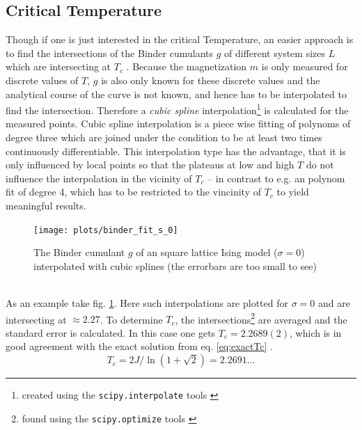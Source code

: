 \subsection{Critical Temperature}
\label{ssec:binderIntersections}
    Though if one is just interested in the critical Temperature, an
    easier approach is to find the intersections of the Binder cumulants
    \(g\) of different system sizes \(L\) which are intersecting at
    \(T_c\) \cite{Binder1981}.
    Because the magnetization \(m\) is only measured for discrete values
    of \(T\), \(g\) is also only known for these discrete values and the
    analytical course of the curve is not known, and hence has
    to be interpolated to find the intersection. Therefore a \emph{cubic spline}
    interpolation\footnote{created using the \texttt{scipy.interpolate} tools \cite{scipy2001}}
    is calculated for the measured points.
    Cubic spline interpolation is a piece wise fitting of polynoms of
    degree three which are joined under the condition to be at least two
    times continuously differentiable. This interpolation type has the
    advantage, that it is only influenced by local points so that the
    plateaus at low and high \(T\) do not influence the interpolation in
    the vicinity of \(T_c\) -- in contrast to e.g. an polynom fit of
    degree 4, which has to be restricted to the vincinity of \(T_c\) to
    yield meaningful results.
    \begin{figure}[htbp]
        \centering
        \texttt{[image: plots/binder\_fit\_s\_0]}
        \caption[Example of a Binder Cumulant to Determine the Critical Temperature]
        {
            The Binder cumulant \(g\) of an square lattice Ising model
            (\(\sigma=0\)) interpolated with cubic splines
            (the errorbars are too small to see)\\
        }
        \label{fig:gettingCrit:binder_fit_s_0}
    \end{figure}\\
    As an example take fig. \ref{fig:gettingCrit:binder_fit_s_0}.
    Here such interpolations are plotted for \(\sigma=0\) and are
    intersecting at \(\approx 2.27\).
    To determine \(T_c\), the intersections\footnote{found using the \texttt{scipy.optimize} tools \cite{scipy2001}}
    are averaged and the standard error is calculated. In this case one
    gets \(T_c = 2.2689(2)\), which is in good agreement with the
    exact solution from eq. \eqref{eq:exactTc} \cite{Onsager1944}.
    \begin{equation}
        T_c = 2J/\ln(1+\sqrt 2) = 2.2691...
        \label{eq:exactTc}
    \end{equation}
